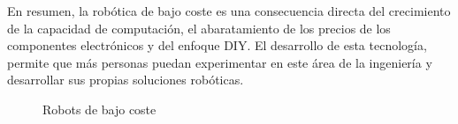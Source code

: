 En resumen, la robótica de bajo coste es una consecuencia directa del crecimiento de la capacidad de computación, 
el abaratamiento de los precios de los componentes electrónicos y del enfoque \acs{DIY}.
El desarrollo de esta tecnología, permite que más personas puedan experimentar en este área de la ingeniería y desarrollar 
sus propias soluciones robóticas.
\begin{figure} [ht!]
  \centering    
  \hspace{1cm}
  \caption{Robots de bajo coste}
\end{figure}
